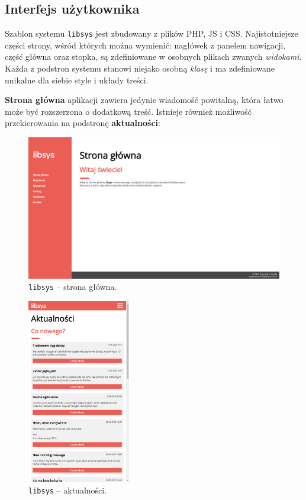 \documentclass[12pt, a4paper]{article}
\begin{document}
\newpage
\subsection{Interfejs użytkownika}

Szablon systemu \texttt{libsys} jest zbudowany z plików PHP, JS i CSS. Najistotniejsze części strony, wśród których można wymienić: nagłówek z panelem nawigacji, część główna oraz stopka, są zdefiniowane w osobnych plikach zwanych \textit{widokami}. Każda z podstron systemu stanowi niejako osobną \textit{klasę} i ma zdefiniowane unikalne dla siebie style i układy treści.

\textbf{Strona główna} aplikacji zawiera jedynie wiadomość powitalną, która łatwo może być rozszerzona o dodatkową treść. Istnieje również możliwość przekierowania na podstronę \textbf{aktualności}:

\begin{figure}[h]
    \centering
    \includegraphics[width=\textwidth]{img/libsys_home.png}
    \caption{\texttt{libsys} -- strona główna.}
\end{figure}

\begin{figure}[h]
    \centering
    \includegraphics[width=0.4\textwidth]{img/libsys_news.png}
    \caption{\texttt{libsys} -- aktualności.}
\end{figure}
\end{document}
